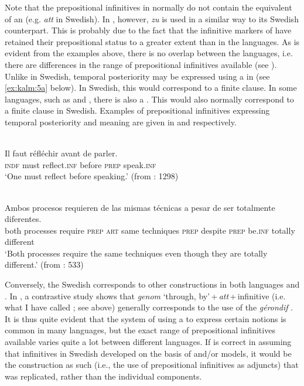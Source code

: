 \documentclass[output=paper]{langscibook}
\begin{document}
Note that the prepositional infinitives in  normally do not contain the equivalent of an  (e.g. \textit{att} in Swedish). In , however, \textit{zu} is used in a similar way to its Swedish counterpart. This is probably due to the fact that the infinitive markers of  have retained their prepositional status to a greater extent than in the  languages. As is evident from the examples above, there is no  overlap between the languages, i.e. there are differences in the range of prepositional infinitives available (see \citealt{Hengenveld1998}). Unlike in Swedish, temporal posteriority may be expressed using a  in  (see \ref{ex:kalm:5a} below). In Swedish, this would correspond to a finite clause. In some  languages, such as  and , there is also a . This would also normally correspond to a finite clause in Swedish. Examples of  prepositional infinitives expressing temporal posteriority and  meaning are given in  and  respectively. 


\ea
\label{ex:kalm:5}
\ea {}\label{ex:kalm:5a}\\ 
\gll Il faut réfléchir avant de parler.\\
\textsc{indf} must reflect.\textsc{inf} before \textsc{prep} speak.\textsc{inf}\\
\glt ‘One must reflect before speaking.’ (from \citealt{Grevisse1993}: 1298) 

\ex {}\label{ex:kalm:5b}\\ 
\gll Ambos procesos requieren de las mismas técnicas a pesar de ser totalmente diferentes.\\
both processes require \textsc{prep} \textsc{art} same techniques \textsc{prep} despite \textsc{prep} be.\textsc{inf} totally different\\
\glt ‘Both processes require the same techniques even though they are totally different.’ (from \citealt{Schulte2007What}: 533)
\z 
\z 



Conversely, the Swedish  corresponds to other constructions in both  languages and . In , a contrastive study shows that \textit{genom} ‘through, by’\,+\,\textit{att}\,+\,infinitive (i.e. what I have called ; see  above) generally corresponds to the use of the \textit{gérondif} \citep[128]{Hellqvist2015}. It is thus quite evident that the system of using a  to express certain  notions is common in many languages, but the exact range of prepositional infinitives available varies quite a lot between different languages. If \citet{Holm1967} is correct in assuming that  infinitives in Swedish developed on the basis of  and/or  models, it would be the construction as such (i.e., the use of prepositional infinitives as  adjuncts) that was replicated, rather than the individual components. 
\end{document}
